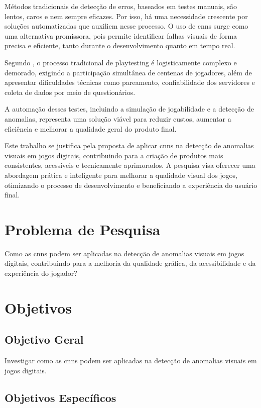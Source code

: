 Métodos tradicionais de detecção de erros, baseados em testes manuais, são lentos, caros e nem sempre eficazes. Por isso, há uma necessidade crescente por soluções automatizadas que auxiliem nesse processo. O uso de \glspl{cnn} surge como uma alternativa promissora, pois permite identificar falhas visuais de forma precisa e eficiente, tanto durante o desenvolvimento quanto em tempo real. 

Segundo , o processo tradicional de playtesting é logisticamente complexo e demorado, exigindo a participação simultânea de centenas de jogadores, além de apresentar dificuldades técnicas como pareamento, confiabilidade dos servidores e coleta de dados por meio de questionários. 

A automação desses testes, incluindo a simulação de jogabilidade e a detecção de anomalias, representa uma solução viável para reduzir custos, aumentar a eficiência e melhorar a qualidade geral do produto final.

Este trabalho se justifica pela proposta de aplicar \glspl{cnn} na detecção de anomalias visuais em jogos digitais, contribuindo para a criação de produtos mais consistentes, acessíveis e tecnicamente aprimorados. A pesquisa visa oferecer uma abordagem prática e inteligente para melhorar a qualidade visual dos jogos, otimizando o processo de desenvolvimento e beneficiando a experiência do usuário final.

\section{Problema de Pesquisa}
Como as \glspl{cnn} podem ser aplicadas na detecção de anomalias visuais em jogos digitais, contribuindo para a melhoria da qualidade gráfica, da acessibilidade e da experiência do jogador?

\section{Objetivos}

\subsection{Objetivo Geral}
	
Investigar como as \glspl{cnn} podem ser aplicadas na detecção de anomalias visuais em jogos digitais.

\subsection{Objetivos Específicos} 

